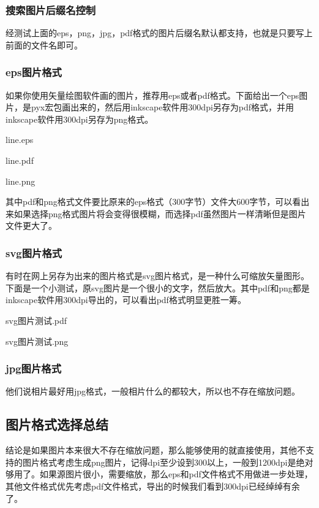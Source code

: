 \documentclass[11pt,oneside]{book}
\begin{document}
\begin{common-format}
\subsubsection{搜索图片后缀名控制}
经测试上面的eps，png，jpg，pdf格式的图片后缀名默认都支持，也就是只要写上前面的文件名即可。

\subsubsection{eps图片格式}
如果你使用矢量绘图软件画的图片，推荐用eps或者pdf格式。下面给出一个eps图片，是pyx宏包画出来的，然后用inkscape软件用300dpi另存为pdf格式，并用inkscape软件用300dpi另存为png格式。
\begin{linefig}{line.eps}
\label{fig:line.eps}
\end{linefig}
\begin{linefig}{line.pdf}
\label{fig:line.pdf}
\end{linefig}
\begin{linefig}{line.png}
\label{fig:line.png}
\end{linefig}
其中pdf和png格式文件要比原来的eps格式（300字节）文件大600字节，可以看出来如果选择png格式图片将会变得很模糊，而选择pdf虽然图片一样清晰但是图片文件更大了。

\subsubsection{svg图片格式}
有时在网上另存为出来的图片格式是svg图片格式，是一种什么可缩放矢量图形。下面是一个小测试，原svg图片是一个很小的文字，然后放大。其中pdf和png都是inkscape软件用300dpi导出的，可以看出pdf格式明显更胜一筹。
\begin{multicols}{2}
\begin{linefig}{svg图片测试.pdf}
\label{fig:svg图片测试.pdf}
\end{linefig}
\begin{linefig}{svg图片测试.png}
\label{fig:svg图片测试.png}
\end{linefig}
\end{multicols}

\subsubsection{jpg图片格式}
他们说相片最好用jpg格式，一般相片什么的都较大，所以也不存在缩放问题。

\subsection{图片格式选择总结}
结论是如果图片本来很大不存在缩放问题，那么能够使用的就直接使用，其他不支持的图片格式考虑生成png图片，记得dpi至少设到300以上，一般到1200dpi是绝对够用了。如果源图片很小，需要缩放，那么eps和pdf文件格式不用做进一步处理，其他文件格式优先考虑pdf文件格式，导出的时候我们看到300dpi已经绰绰有余了。


\end{common-format}
\end{document}
